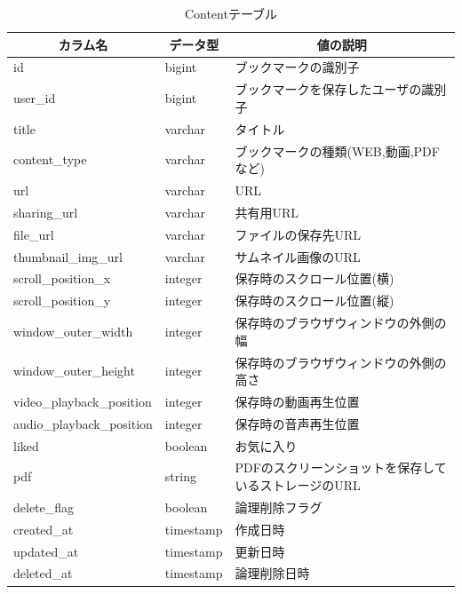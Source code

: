 \begin{table}[htbp]
  \label{tb:design-content-table}
  \caption{Contentテーブル}
  \begin{center}
    \begin{tabular}{|l|l|l|}
      \hline
      \multicolumn{1}{|c|}{\textbf{カラム名}} & \multicolumn{1}{|c|}{\textbf{データ型}} & \multicolumn{1}{|c|}{\textbf{値の説明}} \\\hline
      id & bigint & ブックマークの識別子 \\\hline
      user\_id & bigint & ブックマークを保存したユーザの識別子 \\\hline
      title & varchar & タイトル \\\hline
      content\_type & varchar & ブックマークの種類(WEB,動画,PDFなど) \\\hline
      url & varchar & URL \\\hline
      sharing\_url & varchar & 共有用URL \\\hline
      file\_url & varchar & ファイルの保存先URL \\\hline
      thumbnail\_img\_url & varchar & サムネイル画像のURL \\\hline
      scroll\_position\_x & integer & 保存時のスクロール位置(横) \\\hline
      scroll\_position\_y & integer & 保存時のスクロール位置(縦) \\\hline
      window\_outer\_width & integer & 保存時のブラウザウィンドウの外側の幅 \\\hline
      window\_outer\_height & integer & 保存時のブラウザウィンドウの外側の高さ \\\hline
      video\_playback\_position & integer & 保存時の動画再生位置 \\\hline
      audio\_playback\_position & integer & 保存時の音声再生位置 \\\hline
      liked & boolean & お気に入り \\\hline
      pdf & string & PDFのスクリーンショットを保存しているストレージのURL \\\hline
      delete\_flag & boolean & 論理削除フラグ \\\hline
      created\_at & timestamp & 作成日時 \\\hline
      updated\_at & timestamp & 更新日時 \\\hline
      deleted\_at & timestamp & 論理削除日時 \\\hline
    \end{tabular}
  \end{center}
\end{table}


